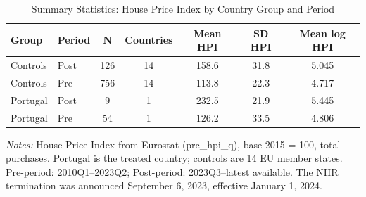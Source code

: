 \begin{table}[H]
\centering
\caption{Summary Statistics: House Price Index by Country Group and Period}
\begin{threeparttable}
\begin{tabular}{llccccc}
\toprule
Group & Period & N & Countries & Mean HPI & SD HPI & Mean log HPI \\
\midrule
Controls & Post & 126 & 14 & 158.6 & 31.8 & 5.045 \\
Controls & Pre & 756 & 14 & 113.8 & 22.3 & 4.717 \\
Portugal & Post & 9 & 1 & 232.5 & 21.9 & 5.445 \\
Portugal & Pre & 54 & 1 & 126.2 & 33.5 & 4.806 \\
\bottomrule
\end{tabular}
\begin{tablenotes}[flushleft]
\small
\item \textit{Notes:} House Price Index from Eurostat (prc\_hpi\_q), base 2015 = 100, total purchases. Portugal is the treated country; controls are 14 EU member states. Pre-period: 2010Q1--2023Q2; Post-period: 2023Q3--latest available. The NHR termination was announced September 6, 2023, effective January 1, 2024.
\end{tablenotes}
\end{threeparttable}
\label{tab:summary}
\end{table}

